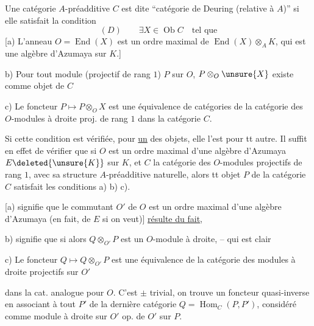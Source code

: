 Une catégorie $A$-préadditive $C$ est dite ``catégorie de Deuring (relative à $A$)'' si elle satisfait la condition
\[
(D)\qquad \exists X\in\operatorname{Ob}C\quad\text{tel que}
\]
[a) L'anneau $O=\operatorname{End}(X)$ est un ordre maximal de $\operatorname{End}(X)\otimes_A K$, qui est une algèbre d'Azumaya sur $K$.]

b) Pour tout module  (projectif de rang $1$) $P$ sur $O$, $P\otimes_O\unsure{X}$  existe comme objet de $C$

c) Le foncteur $P\longmapsto P\otimes_O X$ est une équivalence de catégories de la catégorie des $O$-modules à droite proj. de rang $1$ dans la catégorie $C$.

 Si cette condition est vérifiée,  pour \uline{un} des objets, elle l'est pour tt autre. Il suffit en effet de vérifier que si $O$ est un ordre maximal d'une algèbre d'Azumaya $E\deleted{\unsure{K}}$ sur $K$, et $C$ la catégorie des $O$-modules  projectifs de rang $1$, avec sa structure $A$-préadditive naturelle, alors tt objet $P$ de la catégorie $C$ satisfait les conditions a) b) c).

[a) signifie que le commutant $O'$ de $O$  est \inserted{$\simeq$} un ordre maximal d'une algèbre d'Azumaya (en fait, de $E$ si on veut)] \uline{résulte du fait},

b) signifie que si  alors $Q\otimes_{O'}P$ est un $O$-module à droite, -- qui est clair

c) Le foncteur $Q\longmapsto Q\otimes_{O'}P$ est une équivalence de la catégorie des modules à droite projectifs sur $O'$

dans la cat. analogue pour $O$. C'est $\pm$ trivial, on trouve un foncteur quasi-inverse en associant à tout $P'$ de la dernière catégorie $Q=\operatorname{Hom}_C(P,P')$, considéré comme module à droite sur $O'$  op.  de $O'$ sur $P$.

